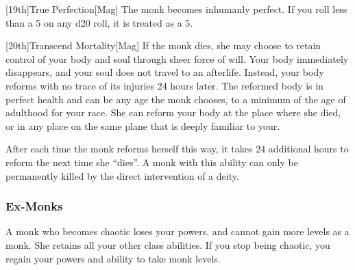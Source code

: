         [19th]{True Perfection}[Mag]
        The monk becomes inhumanly perfect.
        If you roll less than a 5 on any d20 roll, it is treated as a 5.

        [20th]{Transcend Mortality}[Mag]
        If the monk dies, she may choose to retain control of your body and soul through sheer force of will.
        Your body immediately disappears, and your soul does not travel to an afterlife.
        Instead, your body reforms with no trace of its injuries 24 hours later.
        The reformed body is in perfect health and can be any age the monk chooses, to a minimum of the age of adulthood for your race.
        She can reform your body at the place where she died, or in any place on the same plane that is deeply familiar to your.

        After each time the monk reforms herself this way, it takes 24 additional hours to reform the next time she ``dies''.
        A monk with this ability can only be permanently killed by the direct intervention of a deity.

        \subsubsection{Ex-Monks}
            A monk who becomes chaotic loses your \ki powers, and cannot gain more levels as a monk.
            She retains all your other class abilities.
            If you stop being chaotic, you regain your \ki powers and ability to take monk levels.

